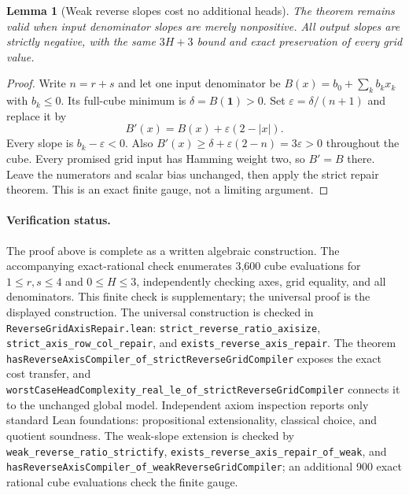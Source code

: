 \documentclass[11pt]{article}
\newtheorem{lemma}{Lemma}
\begin{document}
\begin{lemma}[Weak reverse slopes cost no additional heads]
The theorem remains valid when input denominator slopes are merely
nonpositive. All output slopes are strictly negative, with the same
$3H+3$ bound and exact preservation of every grid value.
\end{lemma}
\begin{proof}
Write $n=r+s$ and let one input denominator be
$B(x)=b_0+\sum_kb_kx_k$ with $b_k\leq0$. Its full-cube minimum is
$\delta=B(\mathbf1)>0$. Set $\varepsilon=\delta/(n+1)$ and replace it by
\[
 B'(x)=B(x)+\varepsilon(2-|x|).
\]
Every slope is $b_k-\varepsilon<0$. Also
$B'(x)\geq\delta+\varepsilon(2-n)=3\varepsilon>0$ throughout the cube.
Every promised grid input has Hamming weight two, so $B'=B$ there.
Leave the numerators and scalar bias unchanged, then apply the strict
repair theorem. This is an exact finite gauge, not a limiting argument.
\end{proof}

\paragraph{Verification status.}
The proof above is complete as a written algebraic construction.
The accompanying exact-rational check enumerates 3,600 cube evaluations
for $1\leq r,s\leq4$ and $0\leq H\leq3$, independently checking axes,
grid equality, and all denominators. This finite check is supplementary;
the universal proof is the displayed construction. The universal construction is checked in
\texttt{ReverseGridAxisRepair.lean}:
\texttt{strict\_reverse\_ratio\_axisize},
\texttt{strict\_axis\_row\_col\_repair}, and
\texttt{exists\_reverse\_axis\_repair}. The theorem
\texttt{hasReverseAxisCompiler\_of\_strictReverseGridCompiler}
exposes the exact cost transfer, and
\texttt{worstCaseHeadComplexity\_real\_le\_of\_strictReverseGridCompiler}
connects it to the unchanged global model. Independent axiom inspection
reports only standard Lean foundations: propositional extensionality,
classical choice, and quotient soundness. The weak-slope extension is
checked by \texttt{weak\_reverse\_ratio\_strictify},
\texttt{exists\_reverse\_axis\_repair\_of\_weak}, and
\texttt{hasReverseAxisCompiler\_of\_weakReverseGridCompiler}; an additional
900 exact rational cube evaluations check the finite gauge.
\end{document}
